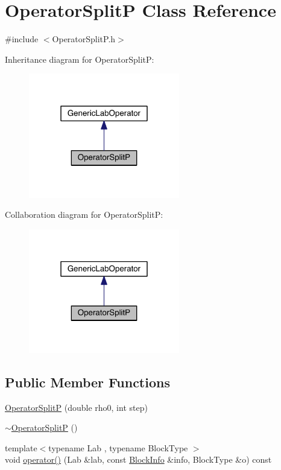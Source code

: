 \hypertarget{class_operator_split_p}{}\section{Operator\+Split\+P Class Reference}
\label{class_operator_split_p}


{\ttfamily \#include $<$Operator\+Split\+P.\+h$>$}



Inheritance diagram for Operator\+Split\+P\+:\nopagebreak
\begin{figure}[H]
\begin{center}
\leavevmode
\includegraphics[width=187pt]{d7/d15/class_operator_split_p__inherit__graph}
\end{center}
\end{figure}


Collaboration diagram for Operator\+Split\+P\+:\nopagebreak
\begin{figure}[H]
\begin{center}
\leavevmode
\includegraphics[width=187pt]{da/d49/class_operator_split_p__coll__graph}
\end{center}
\end{figure}
\subsection*{Public Member Functions}
\begin{DoxyCompactItemize}
\item 
\hyperlink{class_operator_split_p_a6e98b9ffa8fc8b723d165bd8875f4e71}{Operator\+Split\+P} (double rho0, int step)
\item 
\hyperlink{class_operator_split_p_a88289827938a12556d02544d6f2ee1f5}{$\sim$\+Operator\+Split\+P} ()
\item 
{\footnotesize template$<$typename Lab , typename Block\+Type $>$ }\\void \hyperlink{class_operator_split_p_abd37608f5d445bfaf06c9b1f2a31fabf}{operator()} (Lab \&lab, const \hyperlink{struct_block_info}{Block\+Info} \&info, Block\+Type \&o) const 
\end{DoxyCompactItemize}
